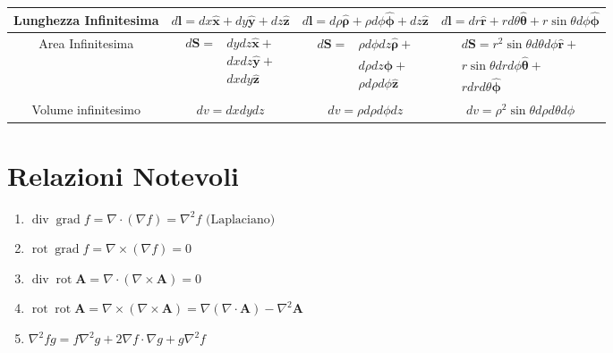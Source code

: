 \begin{table}[!ht]
{\begin{tabular}{|c|c|c|c|}
\hline 
\rule{0pt}{20pt}
Lunghezza Infinitesima & $d \mathbf{l}=d x \hat{\mathbf{x}}+d y \hat{\mathbf{y}}+d z \hat{\mathbf{z}}$ & $d \mathbf{l}=d \rho \hat{\boldsymbol{\rho}}+\rho d \phi \hat{\boldsymbol{\phi}}+d z \hat{\boldsymbol{z}}$ & $d \mathbf{l}=d r \hat{\mathbf{r}}+r d \theta \hat{\boldsymbol{\theta}}+r \sin \theta d \phi \hat{\boldsymbol{\phi}}$ \\
\hline
Area Infinitesima & $\begin{aligned} d \mathbf{S}= & d y d z \hat{\mathbf{x}}+ \\ & d x d z \hat{\mathbf{y}}+ \\ & d x d y \hat{\mathbf{z}}\end{aligned}$ & $\begin{aligned} d \mathbf{S}= & \rho d \phi d z \hat{\boldsymbol{\rho}}+ \\ & d \rho d z \hat{\boldsymbol{\phi}}+ \\ & \rho d \rho d \phi \hat{\mathbf{z}}\end{aligned}$ & $\begin{array}{r}d \mathbf{S}=r^2 \sin \theta d \theta d \phi \hat{\mathbf{r}}+ \\ r \sin \theta d r d \phi \hat{\boldsymbol{\theta}}+ \\ r d r d \theta \hat{\boldsymbol{\phi}}\end{array}$ \\
\hline
\rule{0pt}{20pt}
Volume infinitesimo & $d v=d x d y d z$ & $d v=\rho d \rho d \phi d z$ & $d v=\rho^2 \sin \theta d \rho d \theta d \phi$ \\\hline
\end{tabular}
}
\end{table}

\section{Relazioni Notevoli}


\begin{enumerate}
 \item $\operatorname{div} \operatorname{grad} f=\nabla \cdot(\nabla f)=\nabla^2 f \text { (Laplaciano) }$ 
\item $\operatorname{rot} \operatorname{grad} f=\nabla \times(\nabla f)=0$ 
\item $\operatorname{div} \operatorname{rot} \mathbf{A}=\nabla \cdot(\nabla \times \mathbf{A})=0$ 
\item $\operatorname{rot} \operatorname{rot} \mathbf{A}=\nabla \times(\nabla \times \mathbf{A})=\nabla(\nabla \cdot \mathbf{A})-\nabla^2 \mathbf{A} $
\item $\nabla^2 f g=f \nabla^2 g+2 \nabla f \cdot \nabla g+g \nabla^2 f$
\end{enumerate}

